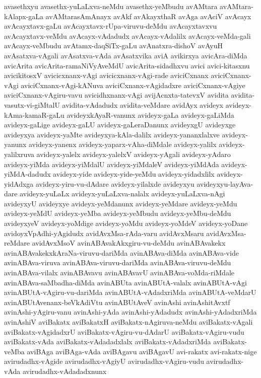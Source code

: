 {avasethxyu
avasethx-yuLaLxva-neMdu
avasethx-yeMbudu
avAMtara
avAMtara-kAlapx-gaLa
avAMtarasAmAnayx
avAkf
avAkayxthaR
avAga
avAciV
avAcayx
avAcayxtavx-gaLu
avAcayxtavx-rUpa-viruvu-deMdu
avAcayxtavxvu
avAcayxtavx-veMdu
avAcayx-vAdadudx
avAcayx-vAdalilx
avAcayx-veMda-gali
avAcayx-veMbudu
avAtamx-daqSiTx-gaLu
avAnatxra-dishoV
avAyuH
avAsatxva-vAgali
avAsatxva-vAda
avAsatxvika
aviA
avikirxya
avicAra-diMda
avicArita
avicArita-ramaNiVyAveMdU
avicArita-sidadhxvu
avici
avici-kitasxnu
avicikitosxV
avicicxnanx-vAgi
avicicxnanx-vAgi-rade
aviciCxnanx
aviciCxnanx-vAgi
aviciCxnanx-vAgi-kANuva
aviciCxnanx-vAgidadxre
aviciCxnanx-vAgiye
aviciCxnanx-vAgiru-vavu
avicidhxnanx-vAgi
avijAcnxta-tatevxV
avidita
avidita-vasutx-vi-giMtalU
avidita-vAdadudx
avidita-veMdare
avidAyx
avideyx
avideyx-kAma-kamaR-gaLu
avideyxkAyaR-vanunx
avideyx-gaLa
avideyx-gaLiMda
avideyx-gaLige
avideyx-gaLU
avideyx-gaLeraDanunx
avideyxgU
avideyxge
avideyxya
avideyx-yaMte
avideyxya-kAla-dalilx
avideyx-yananxlalxve
avideyx-yanunx
avideyx-yanenx
avideyx-yaparx-vAha-diMdale
avideyx-yalilx
avideyx-yalilxruva
avideyx-yalelx
avideyx-yalelxV
avideyx-yAgali
avideyx-yAdaro
avideyx-yiMda
avideyx-yiMdalU
avideyx-yiMdaleV
avideyx-yiMdAda
avideyx-yiMdA-dadudx
avideyx-yide
avideyx-yide-yeMdu
avideyx-yidadxlilx
avideyx-yidAdxga
avideyx-yiru-vu-dAdare
avideyx-yilalxde
avideyxyu
avideyxyu-layAva-dare
avideyx-yuLaLx
avideyx-yuLaLxva-nalalx
avideyx-yuLaLxva-nAgi
avideyxyU
avideyxye
avideyx-yeMdanunx
avideyx-yeMdare
avideyx-yeMdu
avideyx-yeMdU
avideyx-yeMba
avideyx-yeMbudu
avideyx-yeMbu-deMdu
avideyxyeV
avideyx-yoMdige
avideyx-yoMdu
avideyx-yoMdeV
avideyx-yoDane
avidoyxVpAdhi-yAgidudx
avidAvxMsa-rAda-varu
avidAvxMsaru
avidAvxMsa-reMdare
avidAvxMsoV
avinABAvakAkxgiru-vu-deMdu
avinABAvakekx
avinABAvakekxkAraNa-viruvu-dariMda
avinABAva-diMda
avinABAva-vide
avinABAva-viruva
avinABAva-viruvu-dariMda
avinABAva-viruvu-deMdu
avinABAva-vilalx
avinABAvavu
avinABAvavU
avinABAva-voMda-riMdale
avinABAva-saMbadha-diMda
avinABUta
avinABUtA-valalx
avinABUtA-vAgi
avinABUtA-vAgiru-vu-dariMda
avinABUtA-vAdadxriMda
avinABUtA-veMdarU
avinABUtAvenanx-beVkAdiVtu
avinABUtAveV
avinAshi
avinAshitAvxtf
avinAshi-yAgiru-vanu
avinAshi-yAda
avinAshi-yAdadudx
avinAshi-yAdadxriMda
avinAshiV
aviBakatx
aviBakatxH
aviBakatx-nAgiruva-neMdu
aviBakatx-vAgali
aviBakatx-vAgidadxrU
aviBakatx-vAgiru-vu-dAdarU
aviBakatx-vAgiru-vudu
aviBakatx-vAda
aviBakatx-vAdadadxlalx
aviBakatx-vAdadxriMda
aviBakatx-veMba
aviBAga
aviBAga-vAda
aviBAgavu
aviBAgavU
avi-rakatx
avi-rakatx-nige
avirudadhx-vAgide
avirudadhx-vAgiyU
avirudadhx-vAgiru-vudu
avirudadhx-vAda
avirudadhx-vAdadadxnunx
}
